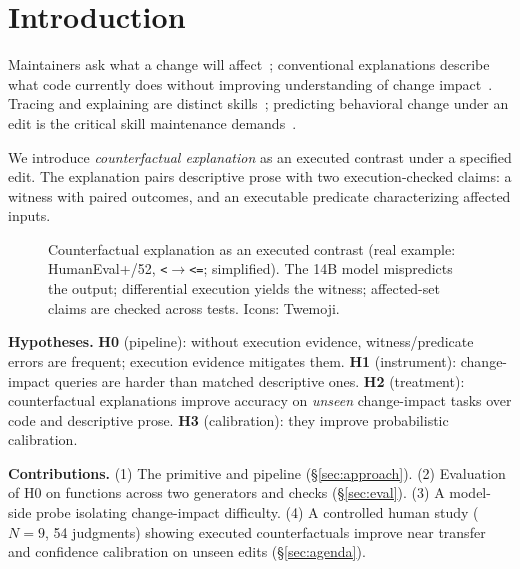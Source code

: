 \section{Introduction}\label{sec:intro}
Maintainers ask what a change will affect~\cite{sillito2006questions,ko2007information}; conventional explanations describe what code currently does without improving understanding of change impact~\cite{nam2024gilt}. Tracing and explaining are distinct skills~\cite{lister2009tracing,murphy2012eipe}; predicting behavioral change under an edit is the critical skill maintenance demands~\cite{sentance2019primm}.

We introduce \emph{counterfactual explanation} as an executed contrast under a specified edit. The explanation pairs descriptive prose with two execution-checked claims: a witness with paired outcomes, and an executable predicate characterizing affected inputs.
\begin{figure}[!t]
\centering

\caption{Counterfactual explanation as an executed contrast (real example: HumanEval+/52, \texttt{<}$\to$\texttt{<=}; simplified). The 14B model mispredicts the output; differential execution yields the witness; affected-set claims are checked across tests. Icons: Twemoji.}\label{fig:teaser}
\end{figure}

\noindent{}
\smallskip

\textbf{Hypotheses.}
\textbf{H0} (pipeline): without execution evidence, witness/predicate errors are frequent; execution evidence mitigates them.
\textbf{H1} (instrument): change-impact queries are harder than matched descriptive ones.
\textbf{H2} (treatment): counterfactual explanations improve accuracy on \emph{unseen} change-impact tasks over code and descriptive prose. \textbf{H3} (calibration): they improve probabilistic calibration.

\textbf{Contributions.} (1) The primitive and \CoDE pipeline (\S\ref{sec:approach}). (2) Evaluation of H0 on \SNMutants{} functions across two generators and checks (\S\ref{sec:eval}). (3) A model-side probe isolating change-impact difficulty. (4) A controlled human study ($N=9$, 54 judgments) showing executed counterfactuals improve near transfer and confidence calibration on unseen edits (\S\ref{sec:agenda}).

